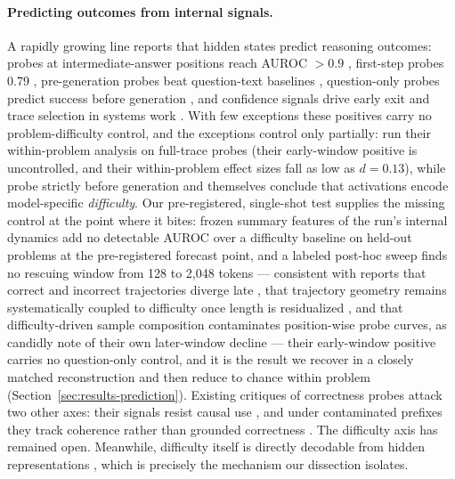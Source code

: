 \paragraph{Predicting outcomes from internal signals.}
A rapidly growing line reports that hidden states predict reasoning
outcomes: probes at intermediate-answer positions reach AUROC $>0.9$
\citep{zhang2025knowright}, first-step probes 0.79
\citep{yuan2026diagnostic}, pre-generation probes beat question-text
baselines \citep{lugoloobi2026}, question-only probes predict success before
generation \citep{cencerrado2025noanswer}, and confidence signals drive
early exit and trace selection in systems work \citep{fu2024certaindex,
fu2025deepconf}. With few exceptions these positives
carry no problem-difficulty control, and the exceptions control only
partially: \citet{yuan2026diagnostic} run their within-problem analysis on
full-trace probes (their early-window positive is uncontrolled, and their
within-problem effect sizes fall as low as $d{=}0.13$), while
\citet{lugoloobi2026} probe strictly before generation and themselves
conclude that activations encode model-specific \emph{difficulty}. Our
pre-registered, single-shot test supplies the missing control at the point
where it bites: frozen
summary features of the run's internal dynamics add no detectable AUROC
over a difficulty baseline on held-out problems at the pre-registered
forecast point, and a labeled post-hoc sweep finds no rescuing window
from 128 to 2{,}048 tokens --- consistent with reports that
correct and incorrect trajectories diverge late \citep{sun2026trajectories},
that trajectory geometry remains systematically coupled to difficulty once
length is residualized \citep{gjolbye2026}, and that difficulty-driven sample composition contaminates position-wise
probe curves, as \citet{david2025temporal} candidly note of their own
later-window decline --- their early-window positive carries no
question-only control, and it is the result we recover in a closely
matched reconstruction and then
reduce to chance within problem (Section~\ref{sec:results-prediction}). Existing critiques of correctness
probes attack two other axes: their signals resist causal use
\citep{yuan2026diagnostic}, and under contaminated prefixes they track
coherence rather than grounded correctness \citep{pair2026}. The
difficulty axis has remained open. Meanwhile, difficulty
itself is directly decodable from hidden representations
\citep{llmknowsdifficulty2025, geometrichardness2026}, which is precisely
the mechanism our dissection isolates.
